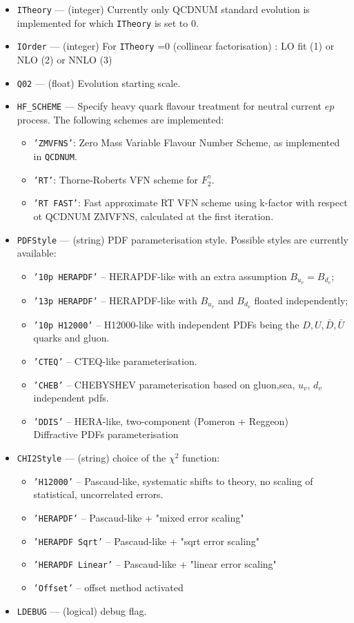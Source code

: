 \label{sec:herafitter}
\begin{itemize}
  \item {\tt ITheory} --- (integer) Currently only QCDNUM standard evolution
     is implemented for which {\tt ITheory} is set to 0.
  \item {\tt IOrder} --- (integer) For {\tt ITheory} =0 (collinear factorisation) : 
        LO fit (1) or NLO (2) or NNLO (3) 
  \item {\tt Q02} --- (float) Evolution starting scale.
  \item {\tt HF\_SCHEME} --- Specify heavy quark flavour treatment for neutral
 current $ep$ process. The following schemes are implemented: 
    \begin{itemize}
      \item {\tt 'ZMVFNS'}: Zero Mass Variable Flavour Number Scheme, as implemented
 in {\tt QCDNUM}.
      \item {\tt 'RT'}: Thorne-Roberts VFN scheme for $F_2^{\gamma}$. 
      \item {\tt 'RT FAST'}: Fast approximate RT VFN scheme using k-factor 
with respect ot QCDNUM ZMVFNS, calculated at the first iteration.
    \end{itemize}
\item {\tt PDFStyle} --- (string) PDF parameterisation style. Possible styles are currently available:
   \begin{itemize}
  \item{\tt '10p HERAPDF'} -- HERAPDF-like with an extra assumption 
                                 $B_{u_v} = B_{d_v}$;
  \item{\tt '13p HERAPDF'} -- HERAPDF-like with $B_{u_v}$ and $B_{d_v}$ 
                          floated independently;
  \item{\tt '10p H12000'}  -- H12000-like with independent PDFs being the
               $D,U,\bar{D},\bar{U}$ quarks and gluon.
  \item{\tt 'CTEQ'}        -- CTEQ-like parameterisation.
  \item{\tt 'CHEB'}        -- CHEBYSHEV parameterisation based on 
         gluon,sea, $u_{v}$, $d_{v}$ independent pdfs.
  \item{\tt 'DDIS'}        -- HERA-like, two-component (Pomeron + Reggeon)\\
			Diffractive PDFs parameterisation
 \end{itemize}
\item {\tt CHI2Style}  --- (string) choice of the $\chi^2$ function:
   \begin{itemize}
   \item {\tt 'H12000'} -- Pascaud-like, systematic shifts to theory, no scaling of statistical, uncorrelated errors.
   \item {\tt 'HERAPDF'} -- Pascaud-like + "mixed error scaling"
   \item {\tt 'HERAPDF Sqrt'}   -- Pascaud-like + "sqrt error scaling"
   \item {\tt 'HERAPDF Linear'} -- Pascaud-like + "linear error scaling"
   \item {\tt 'Offset'} -- offset method activated
 \end{itemize}
  \item {\tt LDEBUG}  --- (logical) debug flag.
\end{itemize}